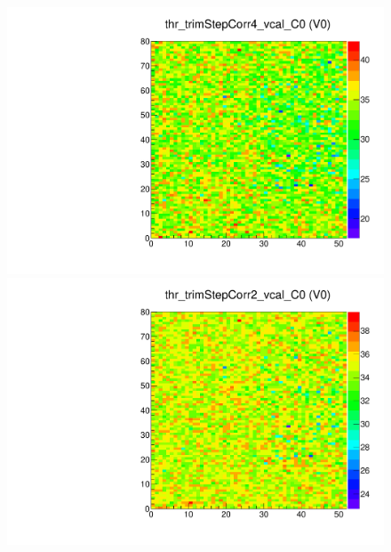 \begin{figure}[!Hp]
\centering
\begin{minipage}{0.45\textwidth}
  \includegraphics[width=1.0\textwidth]{figures/trim_thr_trimStepCorr4_vcal.pdf}
  \caption{}
  \label{fig:trim_thr_trimStepCorr4_vcal}
\end{minipage}
\hspace{0.3cm}
\begin{minipage}{0.45\textwidth}
  \includegraphics[width=1.0\textwidth]{figures/trim_thr_trimStepCorr2_vcal.pdf}
  \caption{}
  \label{fig:trim_thr_trimStepCorr2_vcal}
\end{minipage}
\end{figure}

